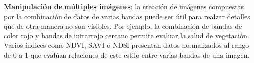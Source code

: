 {\bf Manipulación de múltiples imágenes}: la creación de imágenes compuestas por la combinación de datos de varias
bandas puede ser útil para realzar detalles que de otra manera no son visibles. Por ejemplo, la combinación de bandas
de color rojo y bandas de infrarrojo cercano permite evaluar la salud de vegetación. Varios índices como NDVI, SAVI o
NDSI presentan datos normalizados al rango de 0 a 1 que evalúan relaciones de este estilo entre varias bandas de una
imagen.
